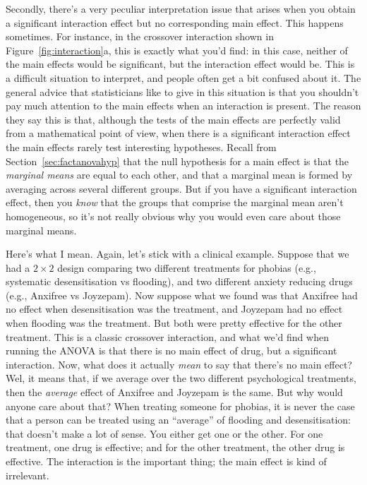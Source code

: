 Secondly, there's a very peculiar interpretation issue that arises when you obtain a significant interaction effect but no corresponding main effect. This happens sometimes. For instance, in the crossover interaction shown in Figure~\ref{fig:interaction}a, this is exactly what you'd find: in this case, neither of the main effects would be significant, but the interaction effect would be. This is a difficult situation to interpret, and people often get a bit confused about it. The general advice that statisticians like to give in this situation is that you shouldn't pay much attention to the main effects when an interaction is present. The reason they say this is that, although the tests of the main effects are perfectly valid from a mathematical point of view, when there is a significant interaction effect the main effects rarely test interesting hypotheses. Recall from Section~\ref{sec:factanovahyp} that the null hypothesis for a main effect is that the {\it marginal means} are equal to each other, and that a marginal mean is formed by averaging across several different groups. But if you have a significant interaction effect, then you {\it know} that the groups that comprise the marginal mean aren't homogeneous, so it's not really obvious why you would even care about those marginal means. 

Here's what I mean. Again, let's stick with a clinical example. Suppose that we had a $2 \times 2$ design comparing two different treatments for phobias (e.g., systematic desensitisation vs flooding), and two different anxiety reducing drugs (e.g., Anxifree vs Joyzepam). Now suppose what we found was that Anxifree had no effect when desensitisation was the treatment, and Joyzepam had no effect when flooding was the treatment. But both were pretty effective for the other treatment. This is a classic crossover interaction, and what we'd find when running the ANOVA is that there is no main effect of drug, but a significant interaction. Now, what does it actually {\it mean} to say that there's no main effect? Wel, it means that, if we average over the two different psychological treatments, then the {\it average} effect of Anxifree and Joyzepam is the same. But why would anyone care about that? When treating someone for phobias, it is never the case that a person can be treated using an ``average'' of flooding and desensitisation: that doesn't make a lot of sense. You either get one or the other. For one treatment, one drug is effective; and for the other treatment, the other drug is effective. The interaction is the important thing; the main effect is kind of irrelevant. 


